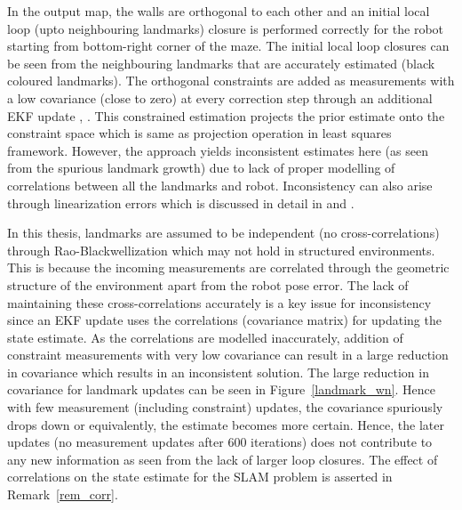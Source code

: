 In the output map, the walls are orthogonal to each other and an initial local loop (upto neighbouring landmarks) closure is performed correctly for the robot starting from bottom-right corner of the maze. The initial local loop closures can be seen from the neighbouring landmarks that are accurately estimated (black coloured landmarks). The orthogonal constraints are added as measurements with a low covariance (close to zero) at every correction step through an additional EKF update \cite{rodriguez2007consistency}, \cite{newman1999structure}. This constrained estimation projects the prior estimate onto the constraint space which is same as projection operation in least squares framework. However, the approach yields inconsistent estimates here (as seen from the spurious landmark growth) due to lack of proper modelling of correlations between all the landmarks and robot. Inconsistency can also arise through linearization errors which is discussed in detail in \cite{rodriguez2007consistency} and \cite{julier2007using}.

In this thesis, landmarks are assumed to be independent (no cross-correlations) through Rao-Blackwellization which may not hold in structured environments. This is because the incoming measurements are correlated through the geometric structure of the environment apart from the robot pose error. The lack of maintaining these cross-correlations accurately is a key issue for inconsistency since an EKF update uses the correlations (covariance matrix) for updating the state estimate. As the correlations are modelled inaccurately, addition of constraint measurements with very low covariance can result in a large reduction in covariance which results in an inconsistent solution. The large reduction in covariance for landmark updates can be seen in Figure~\ref{landmark_wn}. Hence with few measurement (including constraint) updates, the covariance spuriously drops down or equivalently, the estimate becomes more certain. Hence, the later updates (no measurement updates after 600 iterations) does not contribute to any new information as seen from the lack of larger loop closures. The effect of correlations on the state estimate for the SLAM problem is asserted in Remark~\ref{rem_corr}.

